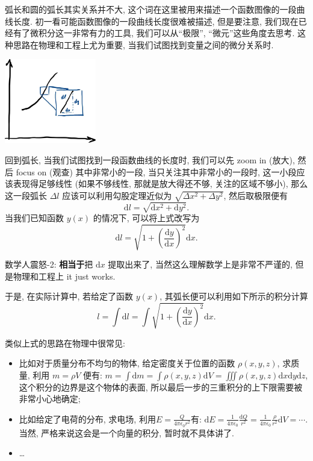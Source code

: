 \begin{tcolorbox}[size=fbox, breakable, enhanced jigsaw, title={弧长 (arc length)}]

弧长和圆的弧长其实关系并不大,
这个词在这里被用来描述一个函数图像的一段曲线长度.
初一看可能函数图像的一段曲线长度很难被描述, 但是要注意,
我们现在已经有了微积分这一非常有力的工具, 我们可以从``极限'',
``微元''这些角度去思考. 这种思路在物理和工程上尤为重要,
当我们试图找到变量之间的微分关系时.

\begin{tcolorbox}[size=fbox, breakable, enhanced jigsaw]
  \includegraphics[width=0.3\textwidth]{img/image-20231108153210418.png}
\end{tcolorbox}

回到弧长, 当我们试图找到一段函数曲线的长度时, 我们可以先 zoom in (放大),
然后 focus on (观查) 其中非常小的一段, 当只关注其中非常小的一段时,
这一小段应该表现得足够线性 (如果不够线性, 那就是放大得还不够,
关注的区域不够小), 那么这一段弧长 \(\Delta l\)
应该可以利用勾股定理近似为 \(\sqrt{\Delta x^2+\Delta y^2}\),
然后取极限便有 \[
\boxed{\mathrm{d}l=\sqrt{\mathrm{d}x^2+\mathrm{d}y^2}}.
\] 当我们已知函数 \(y(x)\) 的情况下, 可以将上式改写为 \[
\mathrm{d}l=\sqrt{1+\left(\frac{\mathrm{d}y}{\mathrm{d}x}\right)^2}\mathrm{d}x.
\]

\begin{newquote}
数学人震怒-2: \textbf{相当于}把 \(\mathrm{d}x\) 提取出来了,
当然这么理解数学上是非常不严谨的, 但是物理和工程上 it just works.
\end{newquote}

于是, 在实际计算中, 若给定了函数 \(y(x)\),
其弧长便可以利用如下所示的积分计算 \[
l=\int\mathrm{d}l=\int\sqrt{1+\left(\frac{\mathrm{d}y}{\mathrm{d}x}\right)^2}\mathrm{d}x.
\]

\begin{newquote}
类似上式的思路在物理中很常见:

\begin{itemize}
\item
  比如对于质量分布不均匀的物体, 给定密度关于位置的函数 \(\rho(x,y,z)\),
  求质量, 利用 \(m=\rho V\) 便有:
  \(m=\int\mathrm{d}m=\int\rho(x,y,z)\mathrm{d}V=\iiint\rho(x,y,z)\mathrm{d}x\mathrm{d}y\mathrm{d}z\),
  这个积分的边界是这个物体的表面,
  所以最后一步的三重积分的上下限需要被非常小心地确定;
\item
  比如给定了电荷的分布, 求电场,
  利用\(E=\frac{Q}{4\pi\epsilon_0 r^2}\)有:
  \(\mathrm{d}E=\frac{1}{4\pi\epsilon_0}\frac{\mathrm{d}Q}{r^2}=\frac{1}{4\pi\epsilon_0}\frac{\rho}{r^2}\mathrm{d}V=\cdots\).
  当然, 严格来说这会是一个向量的积分, 暂时就不具体讲了.
\item
  \ldots{}
\end{itemize}


\end{newquote}
\end{tcolorbox}

